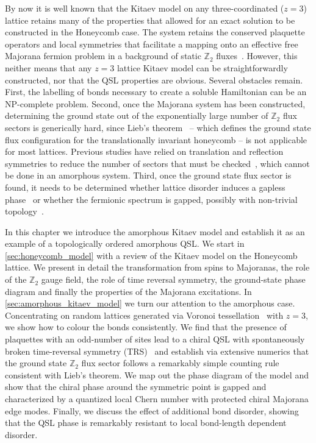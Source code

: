 By now it is well known that the Kitaev model on any three-coordinated ($z=3$) lattice retains many of the properties that allowed for an exact solution to be constructed in the Honeycomb case. The system retains the conserved plaquette operators and local symmetries that facilitate a mapping onto an effective free Majorana fermion problem in a background of static $\mathbb Z_2$ fluxes~\cite{baskaran_exact_2007,baskaran_spin-s_2008,nussinov_bond_2009,obrien_classification_2016,yao_exact_2007,hermanns_weyl_2015}. However, this neither means that any $z=3$ lattice Kitaev model can be straightforwardly constructed, nor that the QSL properties are obvious. Several obstacles remain. First, the labelling of bonds necessary to create a soluble Hamiltonian can be an NP-complete problem. Second, once the Majorana system has been constructed, determining the ground state out of the exponentially large number of $\mathbb Z_2$ flux sectors is generically hard, since Lieb's theorem~\cite{lieb_flux_1994} -- which defines the ground state flux configuration for the translationally invariant honeycomb -- is not applicable for most lattices. Previous studies have relied on translation and reflection symmetries to reduce the number of sectors that must be checked~\cite{yao_exact_2007,eschmann_thermodynamics_2019,peri_non-abelian_2020}, which cannot be done in an amorphous system. Third, once the ground state flux sector is found, it needs to be determined whether lattice disorder induces a gapless phase~\cite{self_thermally_2019,laumann_disorder-induced_2012,lahtinen_topological_2012,self_thermally_2019} or whether the fermionic spectrum is gapped, possibly with non-trivial topology~\cite{yao_exact_2007}.

In this chapter we introduce the amorphous Kitaev model and establish it as an example of a topologically ordered amorphous QSL. We start in \textsection\ref{sec:honeycomb_model} with a review of the Kitaev model on the Honeycomb lattice. We present in detail the transformation from spins to Majoranas, the role of the $\mathbb Z_2$ gauge field, the role of time reversal symmetry, the ground-state phase diagram and finally the properties of the Majorana excitations. In \textsection\ref{sec:amorphous_kitaev_model} we turn our attention to the amorphous case. Concentrating on random lattices generated via Voronoi tessellation~\cite{mitchell_amorphous_2018,marsal_topological_2020} with $z=3$, we show how to colour the bonds consistently. We find that the presence of plaquettes with an odd-number of sites lead to a chiral QSL with spontaneously broken time-reversal symmetry (TRS)~\cite{yao_exact_2007,chua_exact_2011,chua_exactly_2011,fiete_topological_2012,natori_chiral_2016,wu_-matrix_2009, wang_majorana_2021} and establish via extensive numerics that the ground state $\mathbb Z_2$ flux sector follows a remarkably simple counting rule consistent with Lieb's theorem. We map out the phase diagram of the model and show that the chiral phase around the symmetric point is gapped and characterized by a quantized local Chern number with protected chiral Majorana edge modes. Finally, we discuss the effect of additional bond disorder, showing that the QSL phase is remarkably resistant to local bond-length dependent disorder.